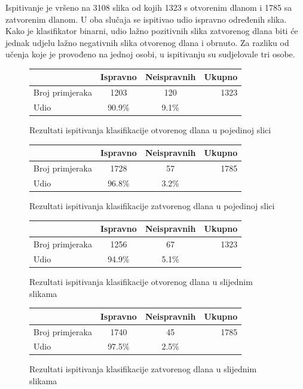 \documentclass[times, utf8, diplomski, numeric]{fer}
\begin{document}
Ispitivanje je vršeno na 3108 slika od kojih 1323 s otvorenim dlanom i 1785  sa zatvorenim dlanom. U oba slučaja se ispitivao udio ispravno određenih slika. Kako je klasifikator binarni, udio lažno pozitivnih slika zatvorenog dlana biti će jednak udjelu lažno negativnih slika otvorenog dlana i obrnuto. Za razliku od učenja koje je provođeno na jednoj osobi, u ispitivanju su sudjelovale tri osobe.
\clearpage
\begin{figure}[h!]
\centering
\begin{tabular}{ l || c c || r }
	& Ispravno  & Neispravnih &Ukupno\\\hline
	Broj primjeraka & 1203 & 120 &1323\\
	Udio&90.9\%&9.1\%
\end{tabular}
\renewcommand{\figurename}{Tablica}
	\caption{Rezultati ispitivanja klasifikacije otvorenog dlana u pojedinoj slici}
	\label{fig:single_img_open}
\end{figure}
\begin{figure}[h!]
\centering
\begin{tabular}{ l || c c || r }
	& Ispravno  & Neispravnih &Ukupno\\\hline
	Broj primjeraka & 1728 & 57 &1785\\
	Udio&96.8\%&3.2\%
\end{tabular}
\renewcommand{\figurename}{Tablica}
	\caption{Rezultati ispitivanja klasifikacije zatvorenog dlana u pojedinoj slici}
	\label{fig:single_img_close}
\end{figure}
\begin{figure}[h!]
\centering
\begin{tabular}{ l || c c || r }
	& Ispravno  & Neispravnih &Ukupno\\\hline
	Broj primjeraka & 1256 & 67 &1323\\
	Udio&94.9\%&5.1\%
\end{tabular}
\renewcommand{\figurename}{Tablica}
	\caption{Rezultati ispitivanja klasifikacije otvorenog dlana u slijednim slikama}
	\label{fig:multi_img_open}
\end{figure}
\begin{figure}[h!]
\centering
\begin{tabular}{ l || c c || r }
	& Ispravno  & Neispravnih &Ukupno\\\hline
	Broj primjeraka & 1740 & 45 &1785\\
	Udio&97.5\%&2.5\%
\end{tabular}
\renewcommand{\figurename}{Tablica}
	\caption{Rezultati ispitivanja klasifikacije zatvorenog dlana u slijednim slikama}
	\label{fig:multi_img_close}
\end{figure}
\end{document}
